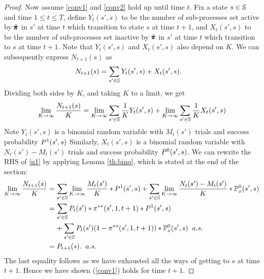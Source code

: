 \begin{proof}{}
Now assume \eqref{conv1} and \eqref{conv2} hold up until time $t$. 
Fix a state $s\in \mathbb{S}$ and time $1\leq t\leq T$, define $Y_t(s',s)$ to be the number of sub-processes set active by $\hat{\pmb{\pi}}$ in $s'$ at time $t$ which transition to state $s$ at time $t+1$, and $X_t(s',s)$ to be the number of sub-processes set inactive by $\hat{\pmb{\pi}}$ in $s'$ at time $t$ which transition to $s$ at time $t+1$. Note that $Y_t(s',s)$ and $X_t(s',s)$ also depend on $K$. 
We can subsequently express $N_{t+1}(s)$ as
\begin{align*}
&N_{t+1}(s) = \sum_{s'\in \mathbb{S}} Y_t(s',s) + X_t(s',s).
\end{align*}
Dividing both sides by $K$, and taking $K$ to a limit, we get 
\begin{equation}\label{n1}
\lim_{K\rightarrow \infty}\frac{N_{t+1}(s)}{K} = \lim_{K\rightarrow \infty}\sum_{s'\in \mathbb{S}} \frac{1}{K} Y_t(s',s) + \lim_{K\rightarrow \infty}\sum_{s'\in \mathbb{S}}\frac{1}{K} X_t(s',s) 
\end{equation}
Note $Y_t(s',s)$ is a binomial random variable with $M_t(s')$ trials and success probability $P^{1}(s',s)$
Similarly, $X_t(s',s)$ is a binomial random variable with $N_t(s')-M_t(s')$ trials and success probability $P^{0}(s',s)$. 
We can rewrite the RHS of \eqref{n1} by applying Lemma \ref{th:bino}, which is stated at the end of the section:
\begin{align}
\lim_{K\rightarrow\infty}\frac{N_{t+1}(s)}{K} &= \sum_{s'\in\mathbb{S}}\lim_{K\rightarrow\infty}\frac{M_t(s')}{K}*P^1(s',s) + \sum_{s'\in\mathbb{S}}\lim_{K\rightarrow\infty}\frac{N_t(s')-M_t(s')}{K}*\mathbb{P}_x^0(s',s)\nonumber\\
& = \sum_{s'\in \mathbb{S}} P_t(s')*\pi^{**}(s',1,t+1)*P^1(s',s)\\
&\;\;\;\;+\sum_{s'\in \mathbb{S}}
P_t(s')(1-\pi^{**}(s',1,t+1))*\mathbb{P}_x^0(s',s)\hspace{2mm}a.s.\nonumber\\ 
&=P_{t+1}(s).\hspace{2mm}a.s. \label{ntlimit} 
\end{align}
The last equality follows as we have exhausted all the ways of getting to $s$ at time $t+1$. Hence we have shown (\ref{conv1}) holds for time $t+1$. 


\end{proof}
